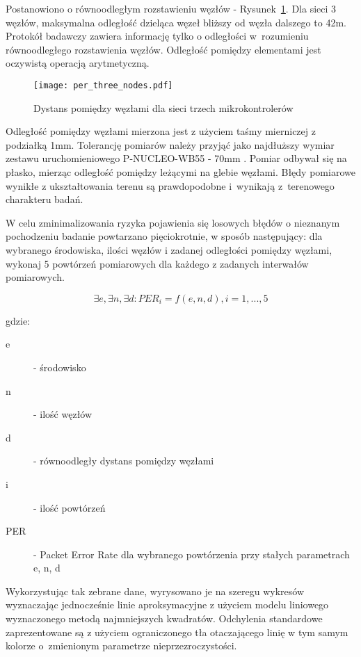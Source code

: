 Postanowiono o równoodległym rozstawieniu węzłów - Rysunek~\ref{rys:three_nodes_setup}. Dla sieci 3 węzłów,
maksymalna odległość dzieląca węzeł bliższy od węzła dalszego to 42m. Protokół badawczy zawiera informację 
tylko o odległości w~rozumieniu równoodległego rozstawienia węzłów. Odległość pomiędzy elementami 
jest oczywistą operacją arytmetyczną.

\begin{figure}[!ht]
	\centering \texttt{[image: per\_three\_nodes.pdf]} 
	\caption{Dystans pomiędzy węzłami dla sieci trzech mikrokontrolerów}
	\label{rys:three_nodes_setup}
\end{figure}

Odległość pomiędzy węzłami mierzona jest z użyciem taśmy mierniczej z podziałką 1mm. Tolerancję pomiarów należy
przyjąć jako najdłuższy wymiar zestawu uruchomieniowego P-NUCLEO-WB55 - 70mm \cite{stmicroelectronics_um2435_2019}.
Pomiar odbywał się na płasko, mierząc odległość pomiędzy leżącymi na glebie węzłami. Błędy pomiarowe wynikłe
z ukształtowania terenu są prawdopodobne i~wynikają z~terenowego charakteru badań.

W celu zminimalizowania ryzyka pojawienia się losowych błędów o nieznanym pochodzeniu badanie powtarzano pięciokrotnie,
w sposób następujący: dla wybranego środowiska, ilości węzłów i zadanej odległości pomiędzy węzłami, wykonaj
5 powtórzeń pomiarowych dla każdego z zadanych interwałów pomiarowych.

\begin{equation}
\label{experiment_definition}
\exists e, \exists n, \exists d: PER_i = f(e, n, d), i=1,...,5
\end{equation}

gdzie:

\begin{description}
\item[e] - środowisko
\item[n] - ilość węzłów
\item[d] - równoodległy dystans pomiędzy węzłami
\item[i] - ilość powtórzeń
\item[PER] - Packet Error Rate dla wybranego powtórzenia przy stałych parametrach e, n, d
\end{description}

Wykorzystując tak zebrane dane, wyrysowano je na szeregu wykresów wyznaczając jednocześnie
linie aproksymacyjne z użyciem modelu liniowego wyznaczonego metodą najmniejszych kwadratów. Odchylenia standardowe zaprezentowane
są z użyciem ograniczonego tła otaczającego linię w tym samym kolorze o~zmienionym parametrze nieprzezroczystości.

